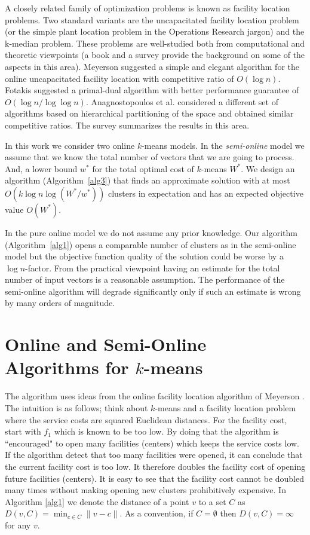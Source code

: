 \documentclass{article}
\begin{document}
A closely related family of optimization problems is known as facility location problems. Two standard variants are the uncapacitated facility location problem (or the simple plant location problem in the Operations Research jargon) and the k-median problem. These problems are well-studied both from computational and theoretic viewpoints (a book \cite{drezner2004facility} and a survey \cite{Vygen05} provide the  background on some of the aspects in this area). Meyerson \cite{Meyerson01} suggested a simple and elegant algorithm for the online uncapacitated facility location with competitive ratio of $O(\log n)$. Fotakis \cite{Fotakis08} suggested a primal-dual algorithm with better performance guarantee of $O(\log n/\log \log n)$. Anagnostopoulos et al. \cite{AilonJM09} considered a different set of algorithms based on hierarchical partitioning of the space and obtained similar competitive ratios. The survey \cite{Fotakis11} summarizes the results in this area.

In this work we consider two online $k$-means models. In the {\it semi-online} model we assume that we know the total number of vectors that we are going to process. 
And, a lower bound $w^*$ for the total optimal cost of $k$-means $W^*$. 
We design an algorithm (Algorithm~\ref{alg3}) that finds an approximate solution with at most $O(k\log n \log (W^*/w^*))$ clusters in expectation and has an expected objective value $O(W^*)$.

In the pure online model we do not assume any prior knowledge.
Our algorithm (Algorithm~\ref{alg1}) opens a comparable number of clusters as in the semi-online model but the objective function quality of the solution could be worse by a $\log n$-factor. 
From the practical viewpoint having an estimate for the total number of input vectors is a reasonable assumption. 
The performance of the semi-online algorithm will degrade significantly only if such an estimate is wrong by many orders of magnitude.  




\section{Online and Semi-Online Algorithms for $k$-means}\label{alg}

The algorithm uses ideas from the online facility location algorithm of Meyerson \cite{Meyerson01}.
The intuition is as follows; think about $k$-means and a facility location problem where the service costs are squared Euclidean distances.
For the facility cost, start with $f_1$ which is known to be too low. 
By doing that the algorithm is ``encouraged" to open many facilities (centers) which keeps the service costs low.
If the algorithm detect that too many facilities were opened, it can conclude that the current facility cost is too low. 
It therefore doubles the facility cost of opening future facilities (centers).
It is easy to see that the facility cost cannot be doubled many times without making opening new clusters prohibitively expensive.
In Algorithm \ref{alg1} we denote the distance of a point $v$ to a set $C$ as $D(v, C) = \min_{c \in C}\|v - c\|$.
As a convention, if $C = \emptyset$ then $D(v, C) = \infty$ for any $v$.
\end{document}
